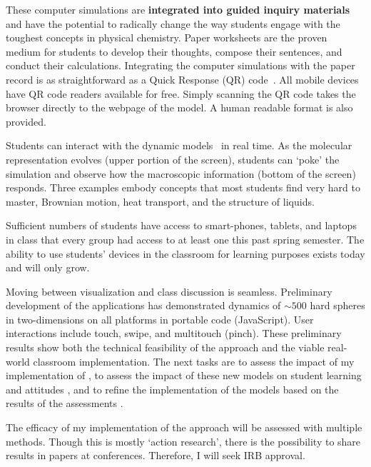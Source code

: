 \documentclass[10pt,letterpaper]{article}
\begin{document}
{These computer simulations are \textbf{integrated into guided inquiry materials} and have the potential to radically change the way students engage with the toughest concepts in physical chemistry. Paper worksheets are the proven medium for students to develop their thoughts, compose their sentences, and conduct their calculations. Integrating the computer simulations with the paper record is as straightforward as a Quick Response (QR) code~. All mobile devices have QR code readers available for free. Simply scanning the QR code takes the browser directly to the webpage of the model. A human readable format is also provided.

Students can interact with the dynamic models~ in real time. As the molecular representation evolves (upper portion of the screen), students can `poke' the simulation and observe how the macroscopic information (bottom of the screen) responds. Three examples  embody concepts that most students find very hard to master, Brownian motion, heat transport, and the structure of liquids.

Sufficient numbers of students have access to smart-phones, tablets, and laptops in class that every \pogil group had access to at least one this past spring semester. The ability to use students' devices in the classroom for learning purposes exists today and will only grow. 

Moving between visualization and class discussion is seamless. Preliminary development of the applications has demonstrated dynamics of $\sim500$ hard spheres in two-dimensions on all platforms in portable code (JavaScript). User interactions include touch, swipe, and multitouch (pinch). These preliminary results show both the technical feasibility of the approach and the viable real-world classroom implementation. The next  tasks are to assess the impact of my implementation of \pogil {}, to assess the impact of these new models on student learning and attitudes , and to refine the implementation of the models based on the results of the assessments .


The efficacy of my implementation of the  \pogil approach will be assessed with multiple methods. Though this is mostly `action research', there is the possibility to share results in papers at \pogil conferences. Therefore,  I will seek IRB approval. 

}
\end{document}
